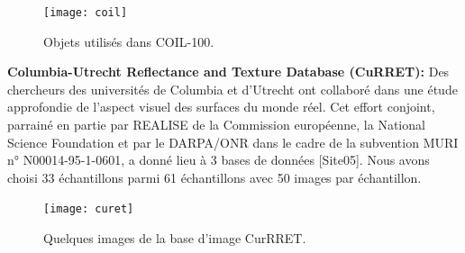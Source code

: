 \begin{figure}[H]
	\centering
	\texttt{[image: coil]} 
	\caption{Objets utilisés dans COIL-100.}
\end{figure}

\textbf{Columbia-Utrecht Reflectance and Texture Database (CuRRET):}
Des chercheurs des universités de Columbia et d'Utrecht ont collaboré dans une étude approfondie de l'aspect visuel des surfaces du monde réel. Cet effort conjoint, parrainé en partie par REALISE de la Commission européenne, la National Science Foundation et par le DARPA/ONR dans le cadre de la subvention MURI n° N00014-95-1-0601, a donné lieu à 3 bases de données [Site05]. Nous avons choisi 33 échantillons parmi 61 échantillons avec 50 images par échantillon.
\begin{figure}[H]
	\centering
	\texttt{[image: curet]} 
	\caption{Quelques images de la base d’image CurRRET.}
\end{figure}

%
%
%

